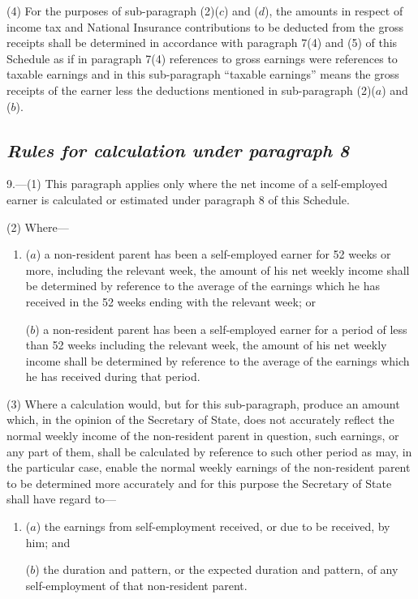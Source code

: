 \documentclass[12pt,a4paper]{article}
\begin{document}
(4) For the purposes of sub-paragraph (2)($c$)  and ($d$), the amounts in respect of income tax and National Insurance contributions to be deducted from the gross receipts shall be determined in accordance with paragraph 7(4) and (5) of this Schedule as if in paragraph 7(4) references to gross earnings were references to taxable earnings and in this sub-paragraph “taxable earnings” means the gross receipts of the earner less the deductions mentioned in sub-paragraph (2)($a$)  and ($b$).


\subsection*{\itshape Rules for calculation under paragraph 8}

9.---(1)  This paragraph applies only where the net income of a self-employed earner is calculated or estimated under paragraph 8 of this Schedule.

(2) Where—
\begin{enumerate}\item[]
($a$) a non-resident parent has been a self-employed earner for 52 weeks or more, including the relevant week, the amount of his net weekly income shall be determined by reference to the average of the earnings which he has received in the 52 weeks ending with the relevant week; or

($b$) a non-resident parent has been a self-employed earner for a period of less than 52 weeks including the relevant week, the amount of his net weekly income shall be determined by reference to the average of the earnings which he has received during that period.
\end{enumerate}

(3) Where a calculation would, but for this sub-paragraph, produce an amount which, in the opinion of the Secretary of State, does not accurately reflect the normal weekly income of the non-resident parent in question, such earnings, or any part of them, shall be calculated by reference to such other period as may, in the particular case, enable the normal weekly earnings of the non-resident parent to be determined more accurately and for this purpose the Secretary of State shall have regard to—
\begin{enumerate}\item[]
($a$) the earnings from self-employment received, or due to be received, by him; and

($b$) the duration and pattern, or the expected duration and pattern, of any self-employment of that non-resident parent.
\end{enumerate}
\end{document}
